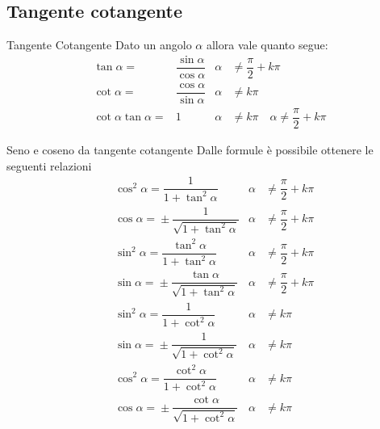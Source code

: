 \subsection{Tangente cotangente}
\label{sec:TangenteCotangente}
\begin{definizionet}{Tangente Cotangente}{}
	Dato un angolo $\alpha$ allora vale quanto segue:
\begin{align}
\tan\alpha=&{}\dfrac{\sin\alpha}{\cos\alpha}&\alpha&{}\neq\dfrac{\pi}{2}+k\pi\label{equ:tangente1}\\
\cot\alpha=&{}\dfrac{\cos\alpha}{\sin\alpha}& \alpha&{}\neq k\pi\label{equ:cotangente1}\\
\cot\alpha\tan\alpha=&{}1&\alpha&{}\neq k\pi\quad\alpha{}\neq\dfrac{\pi}{2}+k\pi
\end{align}
\end{definizionet}
\begin{teoremat}{Seno e coseno da tangente cotangente}
Dalle formule\nobs{} è possibile ottenere le seguenti relazioni
\begin{align*}
&\cos^{2}\alpha={}\dfrac{1}{1+{\tan}^{2}\alpha} &\alpha&{}\neq\dfrac{\pi}{2}+k\pi\\
&\cos\alpha={}\pm\dfrac{1}{\sqrt{1+{\tan}^{2}\alpha}} &\alpha{}&\neq\dfrac{\pi}{2}+k\pi\\
&\sin^{2}\alpha={}\dfrac{\tan^{2}\alpha}{1+\tan^{2}\alpha}&\alpha{}&\neq\dfrac{\pi}{2}+k\pi\\
&\sin\alpha={}\pm\dfrac{\tan\alpha}{\sqrt{1+\tan^{2}\alpha}}&\alpha{}&\neq\dfrac{\pi}{2}+k\pi\\
&\sin^{2}\alpha={}\dfrac{1}{1+{\cot}^{2}\alpha} &\alpha{}&\neq k\pi\\
&\sin\alpha={}\pm\dfrac{1}{\sqrt{1+{\cot}^{2}\alpha}} &\alpha{}&\neq k\pi\\
&\cos^{2}\alpha={}\dfrac{\cot^{2}\alpha}{1+\cot^{2}\alpha}&\alpha{}&\neq k\pi\\
&\cos\alpha={}\pm\dfrac{\cot\alpha}{\sqrt{1+\cot^{2}\alpha}}&\alpha{}&\neq k\pi\\
\end{align*}
\end{teoremat}
